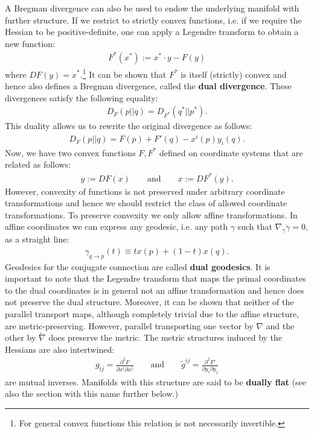     A Bregman divergence can also be used to endow the underlying manifold with further structure. If we restrict to strictly convex functions, i.e. if we require the Hessian to be positive-definite, one can apply a Legendre transform to obtain a new function:
    \begin{gather}
        \label{info:legendre}
        F^*(x^*) := x^*\cdot y - F(y)
    \end{gather}
    where $DF(y)=x^*$.\footnote{For general convex functions this relation is not necessarily invertible.} It can be shown that $F^*$ is itself (strictly) convex and hence also defines a Bregman divergence, called the \textbf{dual divergence}. These divergences satisfy the following equality:
    \begin{gather}
        D_F(p||q) = D_{F^*}(q^*||p^*).
    \end{gather}
    This duality allows us to rewrite the original divergence as follows:
    \begin{gather}
        D_F(p||q) = F(p) + F'(q) - x^i(p)y_i(q).
    \end{gather}
    Now, we have two convex functions $F,F^*$ defined on coordinate systems that are related as follows:
    \begin{gather}
        y:=DF(x) \qquad\text{and}\qquad x:=DF^*(y).
    \end{gather}
    However, convexity of functions is not preserved under arbitrary coordinate transformations and hence we should restrict the class of allowed coordinate transformations. To preserve convexity we only allow affine transformations. In affine coordinates we can express any geodesic, i.e. any path $\gamma$ such that $\nabla_{\dot{\gamma}}\dot{\gamma}=0$, as a straight line:
    \begin{gather}
        \gamma_{q\rightarrow p}(t) \equiv tx(p) + (1-t)x(q).
    \end{gather}
    Geodesics for the conjugate connection are called \textbf{dual geodesics}. It is important to note that the Legendre transform that maps the primal coordinates to the dual coordinates is in general not an affine transformation and hence does not preserve the dual structure. Moreover, it can be shown that neither of the parallel transport maps, although completely trivial due to the affine structure, are metric-preserving. However, parallel transporting one vector by $\nabla$ and the other by $\widetilde{\nabla}$ does preserve the metric. The metric structures induced by the Hessians are also intertwined:
    \begin{gather*}
        g_{ij} = \frac{\partial^2F}{\partial x^i\partial x^j}\qquad\text{and}\qquad \widetilde{g}^{ij} = \frac{\partial^2F'}{\partial y_i\partial y_j}
    \end{gather*}
    are mutual inverses. Manifolds with this structure are said to be \textbf{dually flat} (see also the section with this name further below.)

